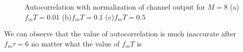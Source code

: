 \documentclass{article}
\begin{document}
\begin{flushleft}
\begin{enumerate}
\newpage
\begin{figure}[H]
\centering
{}
\caption{Autocorrelation with normalization of channel output for $M=8$ (a)$f_mT=0.01$ (b)$f_mT=0.1$ (c)$f_mT=0.5$}
\end{figure}
We can observe that the value of autocorrelation is much inaccurate after $f_m\tau=6$ no matter what the value of $f_mT$ is 



\end{enumerate}
\end{flushleft}
\end{document}
